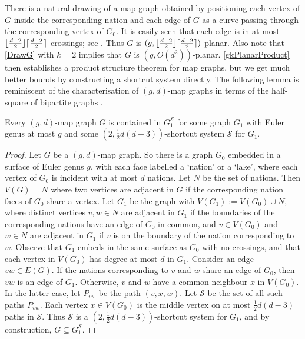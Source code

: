 \documentclass{patmorin}
\DeclarePairedDelimiter{\ceil}{\lceil}{\rceil}
\DeclarePairedDelimiter{\floor}{\lfloor}{\rfloor}
\renewcommand{\SS}{\mathcal{S}}
\begin{document}
There is a natural drawing of a map graph obtained by positioning each vertex of $G$ inside the corresponding nation and each edge of $G$ as a curve passing through the corresponding vertex of $G_0$. It is easily seen that each edge is in at most $\floor{\frac{d-2}{2}}\ceil{\frac{d-2}{2}}$ crossings; see \citep{dujmovic.eppstein.ea:structure}. Thus $G$ is $(g,\floor{\frac{d-2}{2}}\ceil{\frac{d-2}{2}})$-planar. Also note that \cref{DrawG} with $k=2$ implies that $G$ is $(g, O(d^{2}) )$-planar. \cref{gkPlanarProduct} then establishes a product structure theorem for map graphs, but we get much better bounds by constructing a shortcut system directly.  The following lemma is reminiscent of the characterisation of $(g,d)$-map graphs in terms of the half-square of bipartite graphs \citep{CGP02,dujmovic.eppstein.ea:structure}.

\begin{lem}
\label{MapShortcut}
Every $(g,d)$-map graph $G$ is contained in $G_1^\SS$ for some graph $G_1$ with Euler genus at most $g$ and some $(2,\tfrac12 d(d-3) )$-shortcut system $\SS$ for $G_1$.
\end{lem}

\begin{proof}
Let $G$ be a $(g,d)$-map graph. So there is a graph $G_0$ embedded in a surface of Euler genus $g$, with each face labelled a `nation' or a `lake', where each vertex of $G_0$ is incident with at most $d$ nations. Let $N$ be the set of nations. Then $V(G)=N$ where two vertices are adjacent in $G$ if the corresponding nation faces of $G_0$ share a vertex. Let $G_1$ be the graph with $V(G_1):=V(G_0) \cup N$, where distinct vertices $v,w\in N$ are adjacent in $G_1$ if the boundaries of the corresponding nations have an edge of $G_0$ in common, and $v\in V(G_0)$ and $w\in N$ are adjacent in $G_1$ if $v$ is on the boundary of the nation corresponding to $w$. Observe that $G_1$ embeds in the same surface as $G_0$ with no crossings, and that each vertex in $V(G_0)$ has degree at most $d$ in $G_1$. Consider an edge $vw\in E(G)$. If the nations corresponding to $v$ and $w$ share an edge of $G_0$, then $vw$ is an edge of $G_1$. Otherwise,  $v$ and $w$ have a common neighbour $x$ in $V(G_0)$. In the latter case, let $P_{vw}$ be the path $(v,x,w)$. Let $\SS$ be the set of all such paths $P_{vw}$. Each vertex $x\in V(G_0)$ is the middle vertex on at most $\tfrac12 d(d-3)$  paths in $\SS$. Thus $\SS$ is a $(2,\tfrac12 d(d-3))$-shortcut system for $G_1$, and by construction, $G \subseteq G_1^\SS$.
\end{proof}
\end{document}
